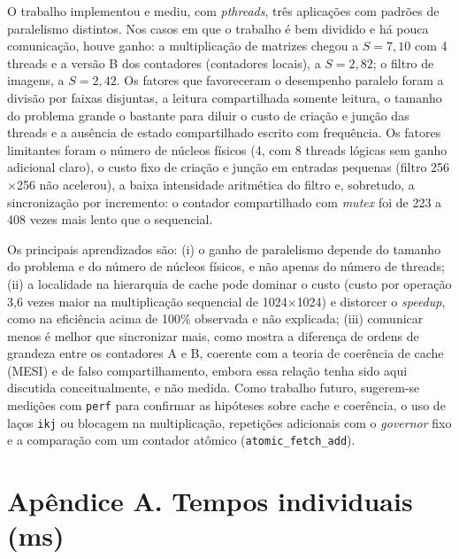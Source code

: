 \documentclass[12pt,a4paper]{article}
\newcommand{\tx}{$\times$}
\begin{document}
O trabalho implementou e mediu, com \emph{pthreads}, três aplicações com padrões de paralelismo distintos. Nos casos em que o trabalho é bem dividido e há pouca comunicação, houve ganho: a multiplicação de matrizes chegou a $S=7{,}10$ com 4 threads e a versão B dos contadores (contadores locais), a $S=2{,}82$; o filtro de imagens, a $S=2{,}42$. Os fatores que favoreceram o desempenho paralelo foram a divisão por faixas disjuntas, a leitura compartilhada somente leitura, o tamanho do problema grande o bastante para diluir o custo de criação e junção das threads e a ausência de estado compartilhado escrito com frequência. Os fatores limitantes foram o número de núcleos físicos (4, com 8 threads lógicas sem ganho adicional claro), o custo fixo de criação e junção em entradas pequenas (filtro 256\tx256 não acelerou), a baixa intensidade aritmética do filtro e, sobretudo, a sincronização por incremento: o contador compartilhado com \emph{mutex} foi de 223 a 408 vezes mais lento que o sequencial.

Os principais aprendizados são: (i) o ganho de paralelismo depende do tamanho do problema e do número de núcleos físicos, e não apenas do número de threads; (ii) a localidade na hierarquia de cache pode dominar o custo (custo por operação 3,6 vezes maior na multiplicação sequencial de 1024\tx1024) e distorcer o \emph{speedup}, como na eficiência acima de 100\% observada e não explicada; (iii) comunicar menos é melhor que sincronizar mais, como mostra a diferença de ordens de grandeza entre os contadores A e B, coerente com a teoria de coerência de cache (MESI) e de falso compartilhamento, embora essa relação tenha sido aqui discutida conceitualmente, e não medida. Como trabalho futuro, sugerem-se medições com \texttt{perf} para confirmar as hipóteses sobre cache e coerência, o uso de laços \texttt{ikj} ou blocagem na multiplicação, repetições adicionais com o \emph{governor} fixo e a comparação com um contador atômico (\texttt{atomic\_fetch\_add}).

\newpage
\appendix
\section*{Apêndice A. Tempos individuais (ms)}
\end{document}

